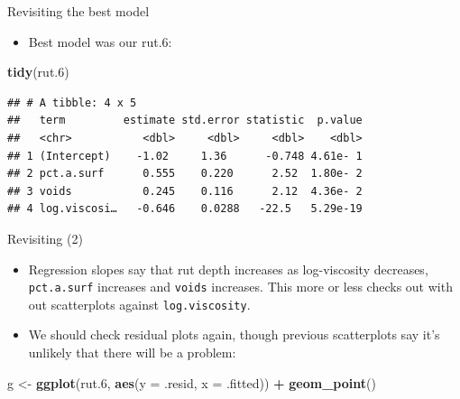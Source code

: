 \documentclass[
  ignorenonframetext,
]{beamer}
\newenvironment{Shaded}{\begin{snugshade}}{\end{snugshade}}
\newcommand{\DataTypeTok}[1]{\textcolor[rgb]{0.13,0.29,0.53}{#1}}
\newcommand{\FloatTok}[1]{\textcolor[rgb]{0.00,0.00,0.81}{#1}}
\newcommand{\KeywordTok}[1]{\textcolor[rgb]{0.13,0.29,0.53}{\textbf{#1}}}
\newcommand{\NormalTok}[1]{#1}
\newcommand{\OperatorTok}[1]{\textcolor[rgb]{0.81,0.36,0.00}{\textbf{#1}}}
\newcommand{\StringTok}[1]{\textcolor[rgb]{0.31,0.60,0.02}{#1}}
\providecommand{\tightlist}{%
  \setlength{\itemsep}{0pt}\setlength{\parskip}{0pt}}
\begin{document}
\begin{frame}[fragile]{Revisiting the best model}
\protect\hypertarget{revisiting-the-best-model}{}

\begin{itemize}
\tightlist
\item
  Best model was our rut.6:
\end{itemize}

\begin{Shaded}
\begin{Highlighting}[]
\KeywordTok{tidy}\NormalTok{(rut}\FloatTok{.6}\NormalTok{)}
\end{Highlighting}
\end{Shaded}

\begin{verbatim}
## # A tibble: 4 x 5
##   term         estimate std.error statistic  p.value
##   <chr>           <dbl>     <dbl>     <dbl>    <dbl>
## 1 (Intercept)    -1.02     1.36      -0.748 4.61e- 1
## 2 pct.a.surf      0.555    0.220      2.52  1.80e- 2
## 3 voids           0.245    0.116      2.12  4.36e- 2
## 4 log.viscosi…   -0.646    0.0288   -22.5   5.29e-19
\end{verbatim}

\end{frame}

\begin{frame}[fragile]{Revisiting (2)}
\protect\hypertarget{revisiting-2}{}

\begin{itemize}
\tightlist
\item
  Regression slopes say that rut depth increases as log-viscosity
  decreases, \texttt{pct.a.surf} increases and \texttt{voids} increases.
  This more or less checks out with out scatterplots against
  \texttt{log.viscosity}.
\item
  We should check residual plots again, though previous scatterplots say
  it's unlikely that there will be a problem:
\end{itemize}

\begin{Shaded}
\begin{Highlighting}[]
\NormalTok{g <-}\StringTok{ }\KeywordTok{ggplot}\NormalTok{(rut}\FloatTok{.6}\NormalTok{, }\KeywordTok{aes}\NormalTok{(}\DataTypeTok{y =}\NormalTok{ .resid, }\DataTypeTok{x =}\NormalTok{ .fitted)) }\OperatorTok{+}\StringTok{ }
\KeywordTok{geom_point}\NormalTok{()}
\end{Highlighting}
\end{Shaded}

\end{frame}
\end{document}
